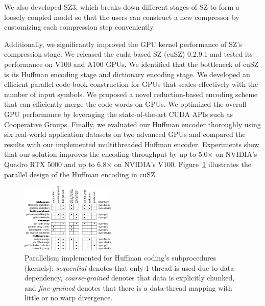 We also developed SZ3, which breaks down different stages of SZ to form a loosely coupled model so that the users can construct a new compressor by customizing each compression step conveniently. %

Additionally, we significantly improved the GPU kernel performance of SZ's compression stage. We released the cuda-based SZ (cuSZ) 0.2.9.1 and tested its performance on V100 and A100 GPUs. We identified that the bottleneck of cuSZ is its Huffman encoding stage and dictionary encoding stage. We developed an efficient parallel code book construction for GPUs that scales effectively with the number of input symbols. We proposed a novel reduction-based encoding scheme that can efficiently merge the code words on GPUs. We optimized the overall GPU performance by leveraging the state-of-the-art CUDA APIs such as Cooperative Groups. Finally, we evaluated our Huffman encoder thoroughly using six real-world application datasets on two advanced GPUs and compared the results with our implemented multithreaded Huffman encoder. Experiments show that our solution improves the encoding throughput by up to 5.0$\times$ on NVIDIA's Quadro RTX 5000 and up to 6.8$\times$ on NVIDIA's V100. Figure~\ref{fig:sz-huffman} illustrates the parallel design of the Huffman encoding in cuSZ. 

\begin{figure}
  \includegraphics[width=0.4\textwidth]{projects/2.3.4-DataViz/2.3.4.14-VeloC-SZ/SZ-Huffman}
  \caption{Parallelism implemented for Huffman coding’s subprocedures (kernels):
\textit{sequential} denotes that only 1 thread is used due to data dependency,
\textit{coarse-grained} denotes that data is explicitly chunked, and \textit{fine-grained} denotes
that there is a data-thread mapping with little or no warp divergence.}%
  \label{fig:sz-huffman}%
\end{figure}



